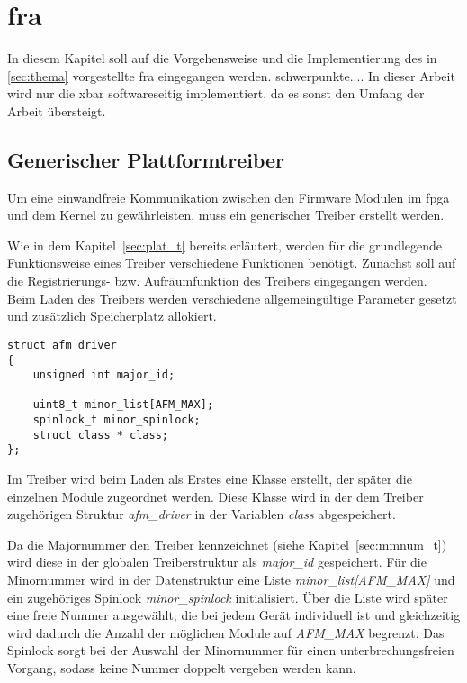 \chapter{\acl{fra}} \label{sec:haupt}
In diesem Kapitel soll auf die  Vorgehensweise und die Implementierung des in \ref{sec:thema} vorgestellte \ac{fra} eingegangen werden. schwerpunkte.... In dieser Arbeit wird nur die \acl{xbar} softwareseitig implementiert, da es sonst den Umfang der Arbeit übersteigt.


\section{Generischer Plattformtreiber} \label{sec:plat}
Um eine einwandfreie Kommunikation zwischen den Firmware Modulen im \ac{fpga} und dem Kernel zu gewährleisten, muss ein generischer Treiber erstellt werden. 


Wie in dem Kapitel~\ref{sec:plat_t} bereits erläutert, werden für die grundlegende Funktionsweise eines Treiber verschiedene Funktionen benötigt. Zunächst soll auf die Registrierungs- bzw. Aufräumfunktion des Treibers eingegangen werden.\\


Beim Laden des Treibers werden verschiedene allgemeingültige Parameter gesetzt und zusätzlich Speicherplatz allokiert. 
\begin{lstlisting}
struct afm_driver
{
	unsigned int major_id;

	uint8_t minor_list[AFM_MAX];
	spinlock_t minor_spinlock;
	struct class * class;
};
\end{lstlisting}

Im Treiber wird beim Laden als Erstes eine Klasse erstellt, der später die einzelnen Module zugeordnet werden. Diese Klasse wird in der dem Treiber zugehörigen Struktur \textit{afm\_driver} in der Variablen \textit{class} abgespeichert. 


Da die Majornummer den Treiber kennzeichnet (siehe Kapitel~\ref{sec:mmnum_t}) wird diese in der globalen Treiberstruktur als \textit{major\_id} gespeichert. Für die Minornummer wird in der Datenstruktur eine Liste \textit{minor\_list[AFM\_MAX]} und ein zugehöriges Spinlock \textit{minor\_spinlock} initialisiert. Über die Liste wird später eine freie Nummer ausgewählt, die bei jedem Gerät individuell ist und gleichzeitig wird dadurch die Anzahl der möglichen Module auf \textit{AFM\_MAX} begrenzt. Das Spinlock sorgt bei der Auswahl der Minornummer für einen unterbrechungsfreien Vorgang, sodass keine Nummer doppelt vergeben werden kann. 


